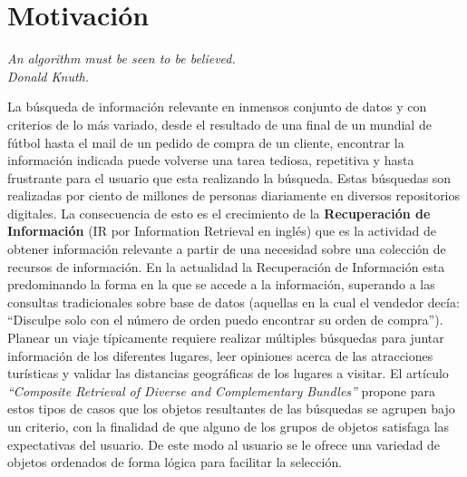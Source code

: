 \section{Motivación}
{\begin{small}%
\begin{flushright}%
\it An algorithm must be seen to be believed.\\Donald Knuth.
\end{flushright}%
\end{small}%
\vspace{.5cm}}
La búsqueda de información relevante en inmensos conjunto de datos y con criterios de lo más variado, desde el resultado de una final de un mundial de fútbol hasta el mail de un pedido de compra de un cliente, encontrar la información indicada puede volverse una tarea tediosa, repetitiva y hasta frustrante para el usuario que esta realizando la búsqueda. Estas búsquedas son realizadas por ciento de millones de personas diariamente en diversos repositorios digitales. La consecuencia de esto es el crecimiento de la \textbf{Recuperación de Información} (IR por Information Retrieval en inglés) que es la actividad de obtener información relevante a partir de una necesidad sobre una colección de recursos de información. En la actualidad la Recuperación de Información esta predominando la forma en la que se accede a la información, superando a las consultas tradicionales sobre base de datos (aquellas en la cual el vendedor decía: ``Disculpe solo con el número de orden puedo encontrar su orden de compra'').\\

Planear un viaje típicamente requiere realizar múltiples búsquedas para juntar información de los diferentes lugares, leer opiniones acerca de las atracciones turísticas y validar las distancias geográficas de los lugares a visitar. El artículo \textit{\textquotedblleft Composite Retrieval of Diverse and Complementary Bundles\textquotedblright}\cite{compositeRetrival} propone para estos tipos de casos que los objetos resultantes de las búsquedas se agrupen bajo un criterio, con la finalidad de que alguno de los grupos de objetos satisfaga las expectativas del usuario. De este modo al usuario se le ofrece una variedad de objetos ordenados de forma lógica para facilitar la selección.\\

